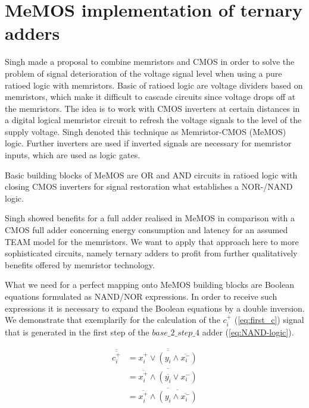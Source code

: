 \documentclass[pageno]{jpaper}
\begin{document}
\section{MeMOS implementation of ternary adders}

Singh \cite{DBLP:journals/corr/Singh15b} made a proposal to combine memristors and CMOS in order to solve the problem of signal deterioration of the voltage signal level when using a pure ratioed logic \cite{Kvatinsky2012} with memristors. Basic of ratioed logic are voltage dividers based on memristors, which make it difficult to cascade circuits since voltage drops off at the memristors. The idea is to work with CMOS inverters at certain distances in a digital logical memristor circuit to refresh the voltage signals to the level of the supply voltage. Singh denoted this technique as Memristor-CMOS (MeMOS) logic. Further inverters are used if inverted signals are necessary for memristor inputs, which are used as logic gates. 

Basic building blocks of MeMOS are OR and AND circuits in ratioed logic with closing CMOS inverters for signal restoration what establishes a NOR-/NAND logic.

Singh showed benefits for a full adder realised in MeMOS in comparison with a CMOS full adder concerning energy consumption and latency for an assumed TEAM model for the memristors. We want to apply that approach here to more sophisticated circuits, namely ternary adders to profit from further qualitatively benefits offered by memristor technology.

What we need for a perfect mapping onto MeMOS building blocks are Boolean equations formulated as NAND/NOR expressions. In order to receive such expressions it is necessary to expand the Boolean equations by a double inversion. We demonstrate that exemplarily for the calculation of the $c_i^+$ (\ref{eq:first_c}) signal that is generated in the first step of the $base\_2\_step\_4$ adder (\ref{eq:NAND-logic}).

\begin{align}
\label{eq:NAND-logic}
\overline{\overline{c_i^+}} &= \overline{ \overline{x_i^+ \vee \left( y_i \wedge \overline{x_i^-} \right)}}\\
&= \overline{\overline{x_i^+} \wedge \left( \overline{y_i} \vee x_i^- \right)} \nonumber \\ 
&= \overline{ \overline{x_i^+} \wedge \overline{ \left( y_i \wedge \overline{x_i^-} \right) } } \nonumber
\end{align}
\end{document}
